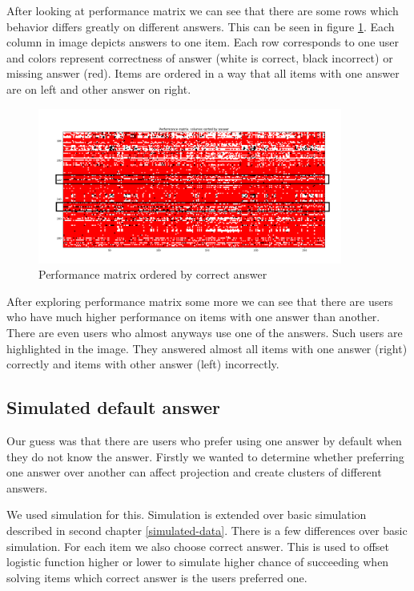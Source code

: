 \documentclass[
  digital, %
  table,   %
  nolof,     %
  nolot,     %
  nocover
]{fithesis3}
\begin{document}
After looking at performance matrix we can see that there are some rows which behavior differs greatly on different answers. This can be seen in figure \ref{fig:performance_matrix}. Each column in image depicts answers to one item. Each row corresponds to one user and colors represent correctness of answer (white is correct, black incorrect) or missing answer (red). Items are ordered in a way that all items with one answer are on left and other answer on right.

\begin{figure}
  \includegraphics[width=10cm]{img/performance_matrix}
  \caption{Performance matrix ordered by correct answer}
  \label{fig:performance_matrix}
\end{figure}


After exploring performance matrix some more we can see that there are users who have much higher performance on items with one answer than another. There are even users who almost anyways use one of the answers. Such users are highlighted in the image. They answered almost all items with one answer (right) correctly and items with other answer (left) incorrectly.


\subsection{Simulated default answer}

Our guess was that there are users who prefer using one answer by default when they do not know the answer. Firstly we wanted to determine whether preferring one answer over another can affect projection and create clusters of different answers.

We used simulation for this. Simulation is extended over basic simulation described in second chapter \ref{simulated-data}. There is a few differences over basic simulation. For each item we also choose correct answer. This is used to offset logistic function higher or lower to simulate higher chance of succeeding when solving items which correct answer is the users preferred one.
\end{document}
